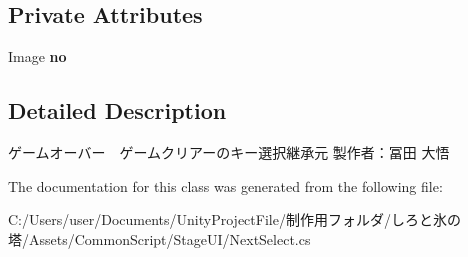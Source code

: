 \subsection*{Private Attributes}
\begin{DoxyCompactItemize}
\item 
\mbox{\label{class_next_select_acd6b9dc28a9e7fb4c7931325639e9420}} 
Image {\bfseries no}
\end{DoxyCompactItemize}


\subsection{Detailed Description}
ゲームオーバー　ゲームクリアーのキー選択継承元 製作者：冨田 大悟 



The documentation for this class was generated from the following file\+:\begin{DoxyCompactItemize}
\item 
C\+:/\+Users/user/\+Documents/\+Unity\+Project\+File/制作用フォルダ/しろと氷の塔/\+Assets/\+Common\+Script/\+Stage\+U\+I/Next\+Select.\+cs\end{DoxyCompactItemize}
